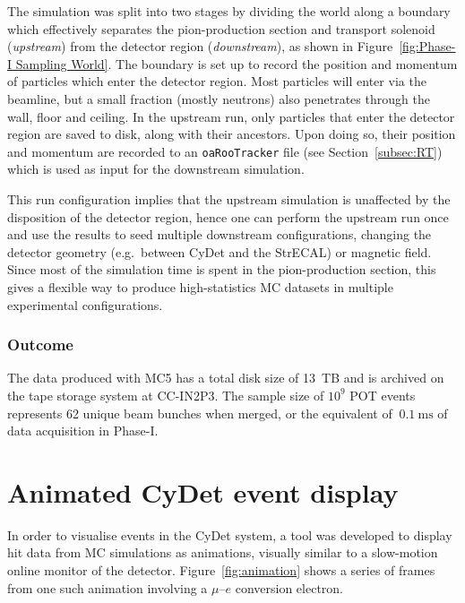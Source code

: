 The simulation was split into two stages by dividing the world along a boundary
which effectively separates the pion-production section and transport solenoid
(\emph{upstream}) from the detector region (\emph{downstream}), as shown in
Figure~\ref{fig:Phase-I Sampling World}. The boundary is set up to record the
position and momentum of particles which enter the detector region. Most
particles will enter via the beamline, but a small fraction (mostly neutrons)
also penetrates through the wall, floor and ceiling. In the upstream run, only
particles that enter the detector region are saved to disk, along with their
ancestors. Upon doing so, their position and momentum are recorded to an
\texttt{oaRooTracker} file (see Section~\ref{subsec:RT}) which is used as input
for the downstream simulation.

This run configuration implies that the upstream simulation is unaffected by the
disposition of the detector region, hence one can perform the upstream run once
and use the results to seed multiple downstream configurations, changing the
detector geometry (e.g.\ between CyDet and the StrECAL) or magnetic field. Since
most of the simulation time is spent in the pion-production section, this gives
a flexible way to produce high-statistics MC datasets in multiple experimental
configurations.

\subsubsection{Outcome}
The data produced with MC5 has a total disk size of \SI{13}{TB} and is archived
on the tape storage system at CC-IN2P3. The sample size of $10^9$ POT events
represents 62 unique beam bunches when merged, or the equivalent of
$~\SI{0.1}{\ms}$ of data acquisition in Phase-I.

\section{Animated CyDet event display}
In order to visualise events in the CyDet system, a tool was developed to display
hit data from MC simulations as animations, visually similar to a slow-motion
online monitor of the detector. Figure~\ref{fig:animation} shows a series of
frames from one such animation involving a $\mu$--$e$ conversion electron.

